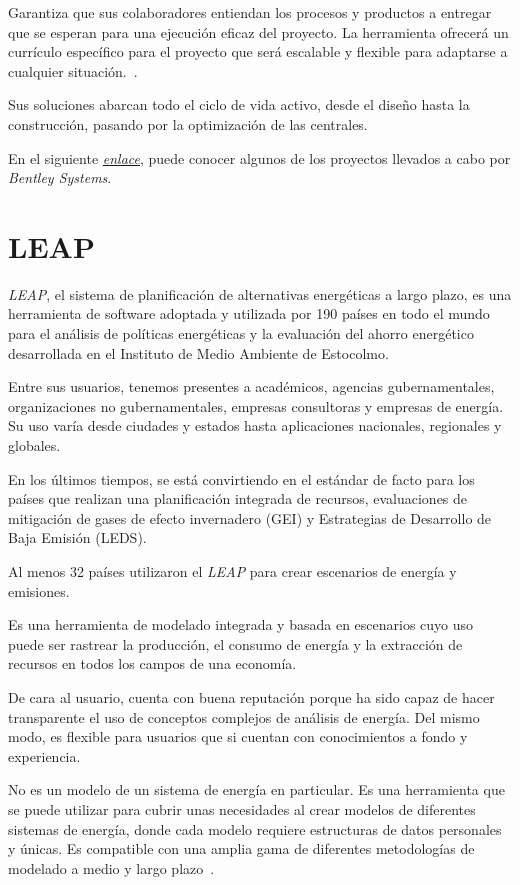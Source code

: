 Garantiza que sus colaboradores entiendan los procesos y productos a entregar que se esperan para una ejecución eficaz del proyecto. La herramienta ofrecerá un currículo específico para el proyecto que será escalable y flexible para adaptarse a cualquier situación.~\cite{web:bentleySystemsAdvancementAcademies}.

Sus soluciones abarcan todo el ciclo de vida activo, desde el diseño hasta la construcción, pasando por la optimización de las centrales.

En el siguiente \href{https://www.bentley.com/es/project-profiles}{\textit{enlace}}, puede conocer algunos de los proyectos llevados a cabo por \textit{Bentley Systems}.

\section{LEAP}

\textit{LEAP}, el sistema de planificación de alternativas energéticas a largo plazo, es una herramienta de software adoptada y utilizada por 190 países en todo el mundo para el análisis de políticas energéticas y la evaluación del ahorro energético desarrollada en el Instituto de Medio Ambiente de Estocolmo.~\cite{web:LEAP}

Entre sus usuarios, tenemos presentes a académicos, agencias gubernamentales, organizaciones no gubernamentales, empresas consultoras y empresas de energía. Su uso varía desde ciudades y estados hasta aplicaciones nacionales, regionales y globales.

En los últimos tiempos, se está convirtiendo en el estándar de facto para los países que realizan una planificación integrada de recursos, evaluaciones de mitigación de gases de efecto invernadero (GEI) y Estrategias de Desarrollo de Baja Emisión (LEDS).

Al menos 32 países utilizaron el \textit{LEAP} para crear escenarios de energía y emisiones.

Es una herramienta de modelado integrada y basada en escenarios cuyo uso puede ser rastrear la producción, el consumo de energía y la extracción de recursos en todos los campos de una economía. 

De cara al usuario, cuenta con buena reputación porque ha sido capaz de hacer transparente el uso de conceptos complejos de análisis de energía. Del mismo modo, es flexible para usuarios que si cuentan con conocimientos a fondo y experiencia.

No es un modelo de un sistema de energía en particular. Es una herramienta que se puede utilizar para cubrir unas necesidades al crear modelos de diferentes sistemas de energía, donde cada modelo requiere estructuras de datos personales y únicas. Es compatible con una amplia gama de diferentes metodologías de modelado a medio y largo plazo~\cite{web:LEAP}.

